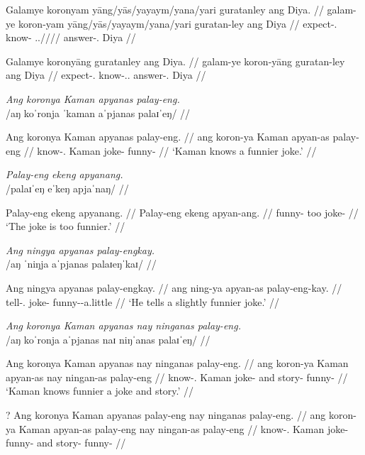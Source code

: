 \documentclass[12pt,a4paper]{scrartcl}
\makeatletter
\def\makefootnotehacks#1{\begingroup
\XKV@for@n{#1}\which{%
\edef\temp{fnhack\which}%
\advance\c@footnote by 1
\expandafter\xdef\csname \temp\endcsname
{\fakesuperscript{\the\c@footnote}}}\endgroup\ignorespaces}%
\newcommand{\PargI}{{\Parg}.{\Inan}}
\newcommand{\TsgM}{{\Tsg}.{\M}}
\newcommand{\TsgF}{{\Tsg}.{\F}}
\makeatother
\begin{document}
\a\ljudge*\begingl
\gla Galamye koronyam yāng/yās/yayaym/yana/yari guratanley ang Diya. //
\glb galam-ye koron-yam yāng/yās/yayaym/yana/yari guratan-ley ang Diya //
\glc expect-\TsgF{} know-\Ptcp{} \TsgM{}.\Aarg{}/\Parg{}/\Dat{}/\Gen{}/\Ins{} answer-\PargI{} \Aarg{} Diya //
\endgl

\a\ljudge*\begingl
\gla Galamye koronyāng guratanley ang Diya. //
\glb galam-ye koron-yāng guratan-ley ang Diya //
\glc expect-\TsgF{} know-\TsgM{}.\Aarg{} answer-\PargI{} \Aarg{} Diya //
\endgl

\xe

\ex\begingl
\glpreamble \textit{Ang koronya Kaman apyanas palay-eng.} \\
	/aŋ koˈronja ˈkaman aˈpjanas palaɪˈeŋ/ //

\gla Ang koronya Kaman apyanas palay-eng. //
\glb ang koron-ya Kaman apyan-as palay-eng //
\glc \AgtT{} know-\TsgM{} Kaman joke-\Parg{} funny-\Comp{} //
\glft `Kaman knows a funnier joke.' //
\endgl\xe

\ex\ljudge*\begingl
\glpreamble \textit{Palay-eng ekeng apyanang.} \\
	/palaɪˈeŋ eˈkeŋ apjaˈnaŋ/ //

\gla Palay-eng ekeng apyanang. //
\glb Palay-eng ekeng apyan-ang. //
\glc funny-\Comp{} too joke-\Aarg{} //
\glft `The joke is too funnier.' //
\endgl\xe

\ex\begingl
\glpreamble \textit{Ang ningya apyanas palay-engkay.} \\
	/aŋ ˈniŋja aˈpjanas palaɪeŋˈkaɪ/ //

\gla Ang ningya apyanas palay-engkay. //
\glb ang ning-ya apyan-as palay-eng-kay. //
\glc \AgtT{} tell-\TsgM{} joke-\Parg{} funny-\Comp{}-a.little //
\glft `He tells a slightly funnier joke.' //
\endgl\xe

\makefootnotehacks{B}
\pex
\a\begingl
\glpreamble \textit{Ang koronya Kaman apyanas nay ninganas palay-eng.} \\
	/aŋ koˈronja aˈpjanas naɪ niŋˈanas palaɪˈeŋ/ //

\gla Ang koronya Kaman apyanas nay ninganas palay-eng. //
\glb ang koron-ya Kaman apyan-as nay ningan-as palay-eng //
\glc \AgtT{} know-\TsgM{} Kaman joke-\Parg{} and story-\Parg{} funny-\Comp{} //
\glft `Kaman knows funnier a joke and story.' //
\endgl

\a\ljudge?\begingl
\gla Ang koronya Kaman apyanas palay-eng nay ninganas {palay-eng.\fnhackB} //
\glb ang koron-ya Kaman apyan-as palay-eng nay ningan-as palay-eng //
\glc \AgtT{} know-\TsgM{} Kaman joke-\Parg{} funny-\Comp{} and story-\Parg{} funny-\Comp{} //
\endgl
\xe
\end{document}
